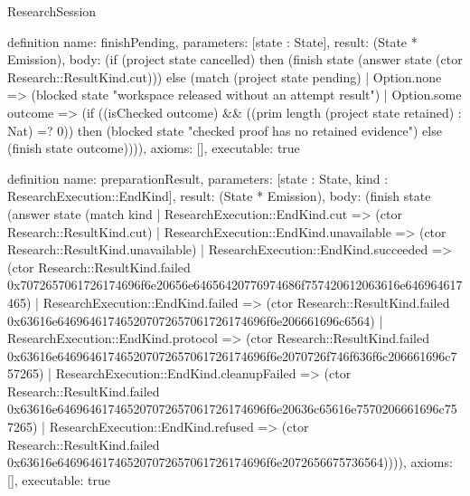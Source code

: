 \begin{lexlean}{ResearchSession}
\begin{semanticmodule}
definition{
 name: finishPending,
 parameters: [state : State],
 result: (State * Emission),
 body: (if (project state cancelled) then (finish state (answer state (ctor Research::ResultKind.cut))) else (match (project state pending) | Option.none => (blocked state "workspace released without an attempt result") | Option.some outcome => (if ((isChecked outcome) && ((prim length (project state retained) : Nat) =? 0)) then (blocked state "checked proof has no retained evidence") else (finish state outcome)))),
 axioms: [],
 executable: true
}

definition{
 name: preparationResult,
 parameters: [state : State, kind : ResearchExecution::EndKind],
 result: (State * Emission),
 body: (finish state (answer state (match kind | ResearchExecution::EndKind.cut => (ctor Research::ResultKind.cut) | ResearchExecution::EndKind.unavailable => (ctor Research::ResultKind.unavailable) | ResearchExecution::EndKind.succeeded => (ctor Research::ResultKind.failed 0x7072657061726174696f6e20656e64656420776974686f757420612063616e646964617465) | ResearchExecution::EndKind.failed => (ctor Research::ResultKind.failed 0x63616e646964617465207072657061726174696f6e206661696c6564) | ResearchExecution::EndKind.protocol => (ctor Research::ResultKind.failed 0x63616e646964617465207072657061726174696f6e2070726f746f636f6c206661696c757265) | ResearchExecution::EndKind.cleanupFailed => (ctor Research::ResultKind.failed 0x63616e646964617465207072657061726174696f6e20636c65616e7570206661696c757265) | ResearchExecution::EndKind.refused => (ctor Research::ResultKind.failed 0x63616e646964617465207072657061726174696f6e2072656675736564)))),
 axioms: [],
 executable: true
}


\end{semanticmodule}
\end{lexlean}
